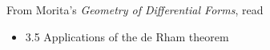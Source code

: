 \documentclass{homework}
\author{Jim Fowler}
\date{Week 9: Applications of cohomology}
\begin{document}
\maketitle

From Morita's \textit{Geometry of Differential Forms}, read
\begin{itemize}
\item 3.5 Applications of the de Rham theorem
\end{itemize}
\end{document}
